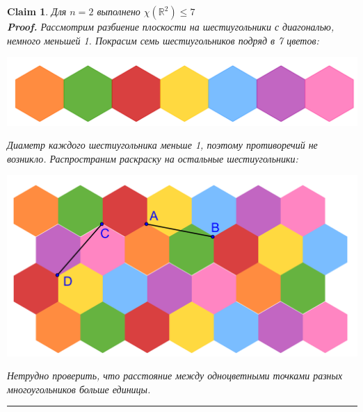 \documentclass{report}%
\newtheorem{claim}[theorem]{Claim}
\newenvironment{proof}[1][Proof]{\textbf{#1.} }{\ \rule{0.5em}{0.5em}}
\begin{document}
\begin{claim}
		Для $n = 2$ выполнено $\chi(\mathbb{R}^2) \leq 7$ \\
		\begin{proof}
				Рассмотрим разбиение плоскости на шестиугольники с диагональю,
				немного меньшей 1. Покрасим семь шестиугольников подряд в 7 цветов: \\		
				\begin{center}
						\includegraphics[scale = 0.12]{R2-1}
				\end{center}
				
				Диаметр каждого  шестиугольника меньше 1, поэтому противоречий не 
				возникло. Распространим раскраску на остальные шестиугольники: \\			
				\begin{center}
						\includegraphics[scale = 0.12]{R2}
				\end{center}
				
				Нетрудно проверить, что расстояние между одноцветными точками разных 
				многоугольников больше единицы.
		\end{proof}
\end{claim}
\end{document}
